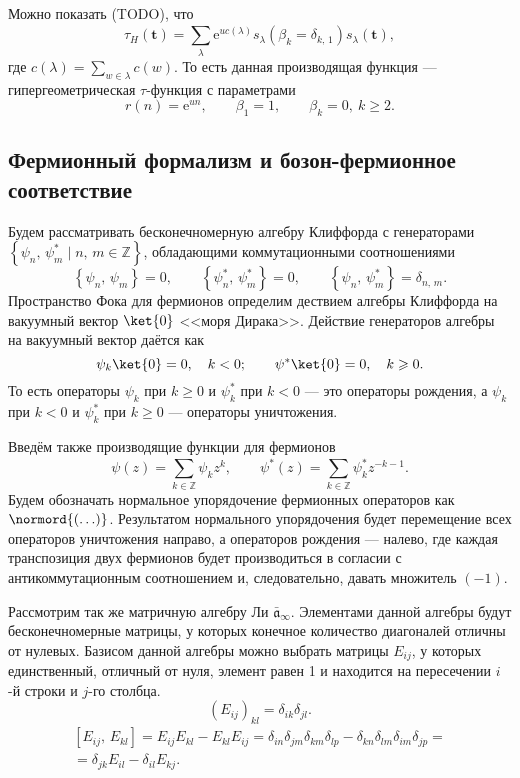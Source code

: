 \documentclass[a4paper, 14pt]{extarticle}
\begin{document}
Можно показать (TODO), что
\begin{equation}
	\tau_H(\mathbf{t})=\sum_{\lambda}^{} \mathrm{e}^{u c(\lambda)}s_\lambda \left( \beta_k=\delta_{k,\,1} \right) 
	s_\lambda(\mathbf{t})
\label{eq:4}
,\end{equation} 
где $c(\lambda)= \sum_{w \in \lambda}^{} c(w)$. 
То есть данная производящая функция --- гипергеометрическая
$\tau$-функция с параметрами
\begin{equation}
	r(n)=\mathrm{e} ^{un},\qquad
	\beta_1=1,\qquad \beta_k=0,\ k\ge 2
.\end{equation} 
\subsection{Фермионный формализм и бозон-фермионное соответствие}
Будем рассматривать бесконечномерную алгебру Клиффорда
с генераторами $\left\{ \psi_n,\,\psi^*_m \mid n,\,m \in \mathbb{Z} \right\} $, обладающими коммутационными соотношениями
\begin{equation}
\left\{ \psi_n,\,\psi_m \right\} =0,\qquad
\left\{ \psi_n^*,\,\psi^*_{m} \right\}=0,\qquad
\left\{ \psi_n,\,\psi_{m}^* \right\}=\delta_{n,\,m}
.\end{equation} 
Пространство Фока для фермионов определим дествием
алгебры Клиффорда на вакуумный вектор $\ket{0}$ <<моря Дирака>>. Действие генераторов алгебры на вакуумный вектор
даётся как
\begin{equation}
\psi_k\ket{0}=0,\quad k<0;\qquad\psi^* \ket{0}=0,\quad
k\ge 0
.\end{equation} 
То есть операторы $\psi_k$ при $k\ge 0$ и $\psi^*_k$ при
$k<0$ --- это операторы рождения, а $\psi_k$ при $k<0$ 
и $\psi_k^*$ при  $k\ge 0$ --- операторы уничтожения.

Введём также производящие функции для фермионов
\[
\psi(z)=\sum _{k\in \mathbb{Z}}^{} \psi_k z^k,\qquad
\psi^* (z)=\sum_{k \in \mathbb{Z}}^{} \psi^*_k z^{-k-1}
.\] 
Будем обозначать нормальное упорядочение фермионных
операторов как $\normord{\left( \ldots \right) }$.
Результатом нормального упорядочения будет перемещение
всех операторов уничтожения направо, а операторов
рождения --- налево, где каждая транспозиция двух
фермионов будет производиться в согласии с антикоммутационным
соотношением и, следовательно, давать множитель $(-1)$. 

Рассмотрим так же матричную алгебру Ли $\bar{\mathfrak{a}}_\infty$.
Элементами данной алгебры будут бесконечномерные матрицы,
у которых конечное количество диагоналей отличны от нулевых.
Базисом данной алгебры можно выбрать матрицы  $E_{ij}$,
у которых единственный, отличный от нуля, элемент равен 1 и находится
на пересечении $i$-й строки и $j$-го столбца.
 \begin{equation}
	(E_{ij})_{kl}=\delta_{ik}\delta_{jl}
.\end{equation} 
\begin{multline}
\left[ E_{ij},\,E_{kl} \right] =
E_{ij}E_{kl}-E_{kl}E_{ij}=
\delta_{in}\delta_{jm}\delta_{km}\delta_{lp}-
\delta_{kn}\delta_{lm}\delta_{im}\delta_{jp}=\\=
\delta_{jk}E_{il}-\delta_{il}E_{kj}
.\end{multline} 
\end{document}
